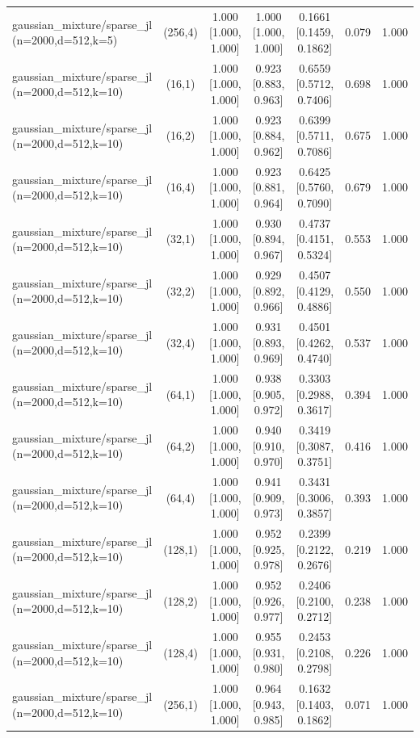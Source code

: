 \begin{tabular}{lcccccc}
gaussian\_mixture/sparse\_jl (n=2000,d=512,k=5) & (256,4) & 1.000 [1.000, 1.000] & 1.000 [1.000, 1.000] & 0.1661 [0.1459, 0.1862] & 0.079 & 1.000 \\
gaussian\_mixture/sparse\_jl (n=2000,d=512,k=10) & (16,1) & 1.000 [1.000, 1.000] & 0.923 [0.883, 0.963] & 0.6559 [0.5712, 0.7406] & 0.698 & 1.000 \\
gaussian\_mixture/sparse\_jl (n=2000,d=512,k=10) & (16,2) & 1.000 [1.000, 1.000] & 0.923 [0.884, 0.962] & 0.6399 [0.5711, 0.7086] & 0.675 & 1.000 \\
gaussian\_mixture/sparse\_jl (n=2000,d=512,k=10) & (16,4) & 1.000 [1.000, 1.000] & 0.923 [0.881, 0.964] & 0.6425 [0.5760, 0.7090] & 0.679 & 1.000 \\
gaussian\_mixture/sparse\_jl (n=2000,d=512,k=10) & (32,1) & 1.000 [1.000, 1.000] & 0.930 [0.894, 0.967] & 0.4737 [0.4151, 0.5324] & 0.553 & 1.000 \\
gaussian\_mixture/sparse\_jl (n=2000,d=512,k=10) & (32,2) & 1.000 [1.000, 1.000] & 0.929 [0.892, 0.966] & 0.4507 [0.4129, 0.4886] & 0.550 & 1.000 \\
gaussian\_mixture/sparse\_jl (n=2000,d=512,k=10) & (32,4) & 1.000 [1.000, 1.000] & 0.931 [0.893, 0.969] & 0.4501 [0.4262, 0.4740] & 0.537 & 1.000 \\
gaussian\_mixture/sparse\_jl (n=2000,d=512,k=10) & (64,1) & 1.000 [1.000, 1.000] & 0.938 [0.905, 0.972] & 0.3303 [0.2988, 0.3617] & 0.394 & 1.000 \\
gaussian\_mixture/sparse\_jl (n=2000,d=512,k=10) & (64,2) & 1.000 [1.000, 1.000] & 0.940 [0.910, 0.970] & 0.3419 [0.3087, 0.3751] & 0.416 & 1.000 \\
gaussian\_mixture/sparse\_jl (n=2000,d=512,k=10) & (64,4) & 1.000 [1.000, 1.000] & 0.941 [0.909, 0.973] & 0.3431 [0.3006, 0.3857] & 0.393 & 1.000 \\
gaussian\_mixture/sparse\_jl (n=2000,d=512,k=10) & (128,1) & 1.000 [1.000, 1.000] & 0.952 [0.925, 0.978] & 0.2399 [0.2122, 0.2676] & 0.219 & 1.000 \\
gaussian\_mixture/sparse\_jl (n=2000,d=512,k=10) & (128,2) & 1.000 [1.000, 1.000] & 0.952 [0.926, 0.977] & 0.2406 [0.2100, 0.2712] & 0.238 & 1.000 \\
gaussian\_mixture/sparse\_jl (n=2000,d=512,k=10) & (128,4) & 1.000 [1.000, 1.000] & 0.955 [0.931, 0.980] & 0.2453 [0.2108, 0.2798] & 0.226 & 1.000 \\
gaussian\_mixture/sparse\_jl (n=2000,d=512,k=10) & (256,1) & 1.000 [1.000, 1.000] & 0.964 [0.943, 0.985] & 0.1632 [0.1403, 0.1862] & 0.071 & 1.000 \\

\end{tabular}
